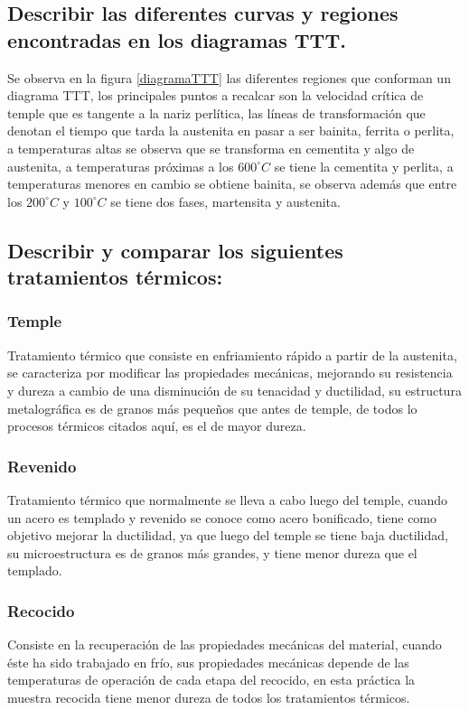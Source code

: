 \documentclass[a4paper, 9pt]{article}
\begin{document}
\subsection{Describir las diferentes curvas y regiones encontradas en los diagramas TTT.}
Se observa en la figura \ref{diagramaTTT} las diferentes regiones que conforman un diagrama TTT, los principales puntos a recalcar son la velocidad crítica de temple que es tangente a la nariz perlítica, las líneas de transformación que denotan el tiempo que tarda la austenita en pasar a ser bainita, ferrita o perlita, a temperaturas altas se observa que se transforma en cementita y algo de austenita, a temperaturas próximas a los $600^{\circ}C$ se tiene la cementita y perlita, a temperaturas menores en cambio se obtiene bainita, se observa además que entre los $200^{\circ}C$ y $100^{\circ}C$ se tiene dos fases, martensita y austenita.  
\subsection{Describir y comparar los siguientes tratamientos térmicos:}
\subsubsection{Temple}
Tratamiento térmico que consiste en enfriamiento rápido a partir de la austenita, se caracteriza por modificar las propiedades mecánicas, mejorando su resistencia y dureza a cambio de una disminución de su tenacidad y ductilidad, su estructura metalográfica es de granos más pequeños que antes de temple, de todos lo procesos térmicos citados aquí, es el de mayor dureza.
\subsubsection{Revenido}
Tratamiento térmico que normalmente se lleva a cabo luego del temple, cuando un acero es templado y revenido se conoce como acero bonificado, tiene como objetivo mejorar la ductilidad, ya que luego del temple se tiene baja ductilidad, su microestructura es de granos más grandes, y tiene menor dureza que el templado.
\subsubsection{Recocido}
Consiste en la recuperación de las propiedades mecánicas del material, cuando éste ha sido trabajado en frío, sus propiedades mecánicas depende de las temperaturas de operación de cada etapa del recocido, en esta práctica la muestra recocida tiene menor dureza de todos los tratamientos térmicos.
\end{document}
